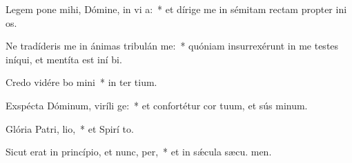 \item Legem pone mihi, Dómine, in vi a:~* et dírige me in sémitam rectam propter ini os.
\item Ne tradíderis me in ánimas tribulán me:~* quóniam insurrexérunt in me testes iníqui, et mentíta est iní bi.
\item Credo vidére bo mini~* in ter tium.
\item Exspécta Dóminum, viríli ge:~* et confortétur cor tuum, et sús minum.
\item Glória Patri,  lio,~* et Spirí to.
\item Sicut erat in princípio, et nunc,  per,~* et in sǽcula sæcu. men.
